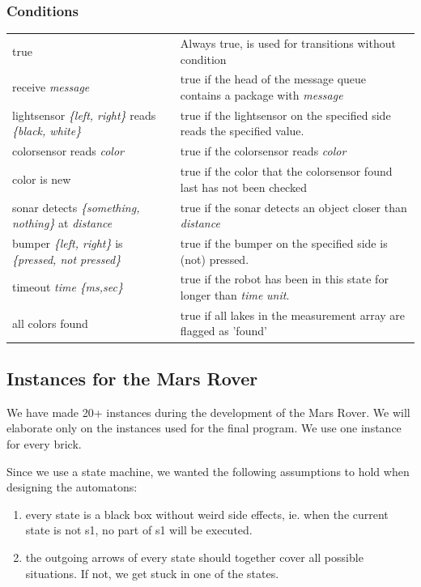 \documentclass[11pt,a4paper]{article}
\begin{document}
\subsubsection{Conditions}
\begin{tabular}{p{6cm}p{10cm}}
true & Always true, is used for transitions without condition\\
receive \emph{message} & true if the head of the message queue contains a package with \emph{message}\\
lightsensor \emph{\{left, right\}} reads \emph{\{black, white\}} & true if the lightsensor on the specified side reads the specified value.\\
colorsensor reads \emph{color} & true if the colorsensor reads \emph{color}\\
color is new & true if the color that the colorsensor found last has not been checked\\
sonar detects \emph{\{something, nothing\}} at \emph{distance} & true if the sonar detects an object closer than \emph{distance}\\
bumper \emph{\{left, right\}} is \emph{\{pressed, not pressed\}} & true if the bumper on the specified side is (not) pressed.\\
timeout \emph{time} \emph{\{ms,sec\}} & true if the robot has been in this state for longer than \emph{time} \emph{unit}.\\
all colors found & true if all lakes in the measurement array are flagged as 'found'\\
\end{tabular}

\subsection*{Instances for the Mars Rover}
We have made 20+ instances during the development of the Mars Rover. We will elaborate only on the instances used for the final program.
We use one instance for every brick.

Since we use a state machine, we wanted the following assumptions to hold when designing the automatons:
\begin{enumerate}
\item every state is a black box without weird side effects, ie. when the current state is not s1, no part of s1 will be executed.
\item the outgoing arrows of every state should together cover all possible situations. If not, we get stuck in one of the states.
\end{enumerate}
\end{document}
